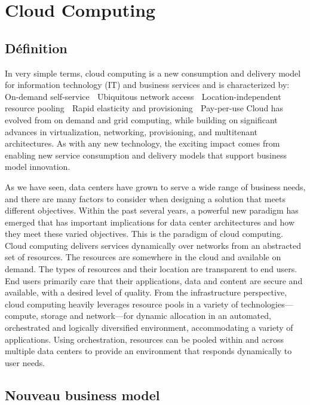 \chapter{Cloud Computing}

\section{Définition}
In very simple terms, cloud computing is a new consumption and delivery model for information technology (IT) and business services and is characterized by:
􏰂 On-demand self-service
􏰂 Ubiquitous network access
􏰂 Location-independent resource pooling
􏰂 Rapid elasticity and provisioning
􏰂 Pay-per-use
Cloud has evolved from on demand and grid computing, while building on significant advances in virtualization, networking, provisioning, and multitenant architectures. As with any new technology, the exciting impact comes from enabling new service consumption and delivery models that support business model innovation.

As we have seen, data centers have grown to serve a wide range of business needs, and there are many factors to consider when designing a solution that meets different objectives. Within the past several years, a powerful new paradigm has emerged that has important implications for data center architectures and how they meet these varied objectives. This is the paradigm of cloud computing.
Cloud computing delivers services dynamically over networks from an abstracted set of resources. The resources are somewhere in the cloud and available on demand. The types of resources and their location are transparent to end users. End users primarily care that their applications, data and content are secure and available, with a desired level of quality.
From the infrastructure perspective, cloud computing heavily leverages resource pools in a variety of technologies— compute, storage and network—for dynamic allocation in an automated, orchestrated and logically diversified environment, accommodating a variety of applications. Using orchestration, resources can be pooled within and across multiple data centers to provide an environment that responds dynamically to user needs.

\section{Nouveau business model}

